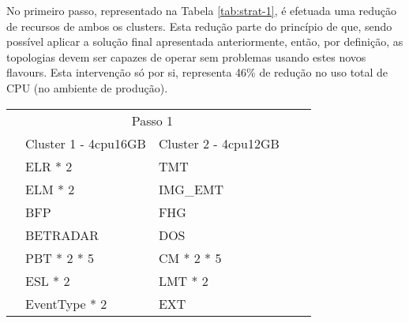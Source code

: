 No primeiro passo, representado na Tabela \ref{tab:strat-1}, é efetuada uma redução de recursos 
de ambos os \glspl{cluster}. Esta redução parte do princípio de que, sendo possível aplicar a 
solução final apresentada anteriormente, então, por definição, as topologias devem ser capazes de
operar sem problemas usando estes novos \glspl{flavour}. Esta intervenção só por si, representa
46\% de redução no uso total de \ac{CPU} (no ambiente de produção).

\begin{table}[H]
  \centering
  \small 
  \setlength{\extrarowheight}{3pt}
  \setlength{\arrayrulewidth}{1pt} 
  
  \begin{tabular}{|l|l|l|l|l|}
    \hline
    \cellcolor{white} & \multicolumn{2}{|c|}{\cellcolor[HTML]{FBE6A3}Passo 1} & \cellcolor{white}              & \cellcolor{white}               \\ \cline{2-3} 
    & \cellcolor[HTML]{4EAC5B}Cluster 1 - 4cpu16GB          & \cellcolor[HTML]{4EAC5B}Cluster 2 - 4cpu12GB          &               &               \\ \cline{2-3} 
    & \cellcolor[HTML]{A9D08E}ELR * 2                       & \cellcolor[HTML]{BDD7EE}TMT                           &               &               \\ \cline{2-3} 
    & \cellcolor[HTML]{A9D08E}ELM * 2                       & \cellcolor[HTML]{BDD7EE}IMG\_EMT                      &               &               \\ \cline{2-3} 
    & \cellcolor[HTML]{A9D08E}BFP                           & \cellcolor[HTML]{BDD7EE}FHG                           &               &               \\ \cline{2-3} 
    & \cellcolor[HTML]{A9D08E}BETRADAR                      & \cellcolor[HTML]{BDD7EE}DOS                           &               &               \\ \cline{2-3} 
    & \cellcolor[HTML]{A9D08E}PBT * 2 * 5                   & \cellcolor[HTML]{BDD7EE}CM * 2 * 5                    &               &               \\ \cline{2-3} 
    & \cellcolor[HTML]{A9D08E}ESL * 2                       & \cellcolor[HTML]{BDD7EE}LMT * 2                       &               &               \\ \cline{2-3} 
    & \cellcolor[HTML]{A9D08E}EventType * 2                 & \cellcolor[HTML]{BDD7EE}EXT                           &               &               \\ \cline{2-3} 

\end{tabular}
\end{table}

